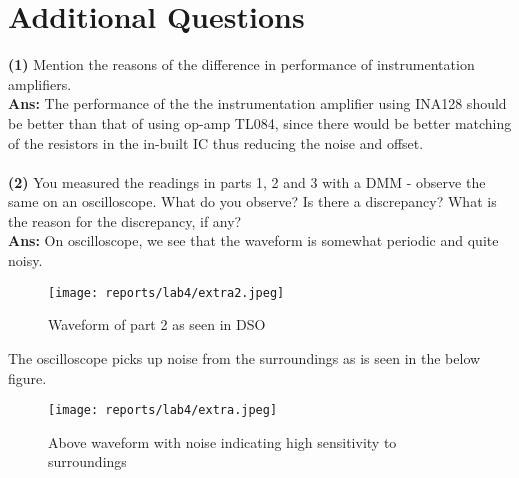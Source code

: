 \documentclass[12pt]{article}
\begin{document}
\newpage
\section{Additional Questions}

    \textbf{(1)} Mention the reasons of the difference in performance of instrumentation
    amplifiers.\\
    \textbf{Ans:} The performance of the the instrumentation amplifier using INA128 should be better than that of using op-amp TL084, since there would be better matching of the resistors in the in-built IC thus reducing the noise and offset.
    \\\\
    \textbf{(2)} You measured the readings in parts 1, 2 and 3 with a DMM - observe the
    same on an oscilloscope. What do you observe? Is there a discrepancy?
    What is the reason for the discrepancy, if any?\\
    \textbf{Ans:} On oscilloscope, we see that the waveform is somewhat periodic and quite noisy.
    \begin{figure}[H]
        \centering
        \texttt{[image: reports/lab4/extra2.jpeg]}
        \caption{Waveform of part 2 as seen in DSO}
    \end{figure}
    \noindent
    The oscilloscope picks up noise from the surroundings as is seen in the below figure.
    \begin{figure}[H]
        \centering
        \texttt{[image: reports/lab4/extra.jpeg]}
        \caption{Above waveform with noise indicating high sensitivity to surroundings}
    \end{figure}
\end{document}
